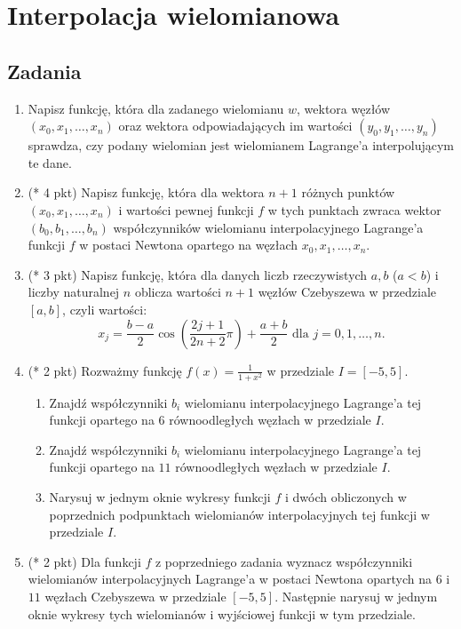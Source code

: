 \documentclass[12pt,a4paper]{article}
\theoremstyle{definition}
\begin{document}
\section*{Interpolacja wielomianowa}


\subsection*{Zadania}
\begin{enumerate}
	
\item Napisz funkcję, która dla zadanego wielomianu $w$, wektora węzłów $(x_0,x_1,\ldots, x_n)$ oraz wektora odpowiadających im wartości $(y_0,y_1,\ldots,y_n)$ sprawdza, czy podany wielomian jest wielomianem Lagrange'a interpolującym te dane.


\item (* 4 pkt) Napisz funkcję, która dla wektora $n+1$ różnych punktów $(x_0,x_1,\ldots,x_n)$ i wartości pewnej funkcji $f$ w tych punktach zwraca wektor $(b_0,b_1,\ldots,b_n)$  współczynników wielomianu interpolacyjnego Lagrange'a funkcji $f$ w postaci Newtona opartego na węzłach $x_0,x_1,\ldots,x_n$.



\item (* 3 pkt) Napisz funkcję, która dla danych liczb rzeczywistych $a,b$ ($a<b$) i liczby naturalnej $n$ oblicza wartości $n+1$ węzłów Czebyszewa w przedziale $[a,b]$, czyli wartości:
$$x_j=\frac{b-a}{2}\cos(\frac{2j+1}{2n+2}\pi)+\frac{a+b}{2} \text{ dla } j=0,1,\ldots,n.$$

\item (* 2 pkt) Rozważmy funkcję $f(x)=\frac{1}{1+x^2}$ w przedziale $I=[-5,5]$.
\begin{enumerate}
	\item Znajdź współczynniki $b_i$ wielomianu interpolacyjnego Lagrange'a tej funkcji opartego na $6$ równoodległych węzłach w przedziale $I$.
	\item Znajdź współczynniki $b_i$ wielomianu interpolacyjnego Lagrange'a tej funkcji opartego na $11$ równoodległych węzłach w przedziale $I$.
	\item Narysuj w jednym oknie wykresy funkcji $f$ i dwóch obliczonych w poprzednich podpunktach wielomianów interpolacyjnych tej funkcji w przedziale $I$.
\end{enumerate}

\item (* 2 pkt) Dla funkcji $f$ z poprzedniego zadania wyznacz współczynniki wielomianów interpolacyjnych Lagrange'a w postaci Newtona opartych na $6$ i $11$ węzłach Czebyszewa w przedziale $[-5,5]$. Następnie narysuj w jednym oknie wykresy tych wielomianów i wyjściowej funkcji w tym przedziale.



\end{enumerate}
\end{document}
